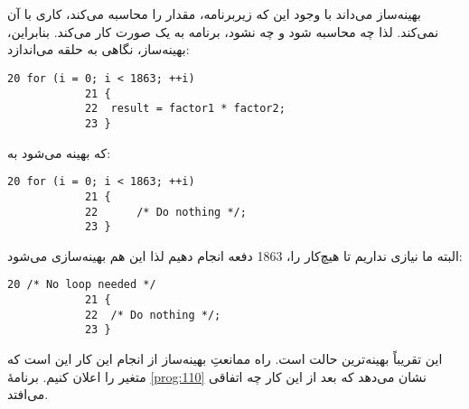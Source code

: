 \section{}
\paragraph{}\label{answer:89}
بهینه‌ساز می‌داند با وجود این که زیربرنامه، مقدار  را محاسبه می‌کند، کاری با آن نمی‌کند. لذا چه  محاسبه شود و چه نشود، برنامه به یک صورت کار می‌کند. بنابراین، بهینه‌ساز، نگاهی به حلقه می‌اندازد:
\begin{LTR}
        \begin{lstlisting}[style=C++Style]
            20 for (i = 0; i < 1863; ++i)
            21 {
            22  result = factor1 * factor2;
            23 }
        \end{lstlisting}
\end{LTR}
که بهینه می‌شود به:
\begin{LTR}
        \begin{lstlisting}[style=C++Style]
            20 for (i = 0; i < 1863; ++i)
            21 {
            22      /* Do nothing */;
            23 }
        \end{lstlisting}
\end{LTR}

البته ما نیازی نداریم تا هیچ‌کار را، 1863 دفعه انجام دهیم لذا این هم بهینه‌سازی می‌شود:
\begin{LTR}
        \begin{lstlisting}[style=C++Style]
            20 /* No loop needed */
            21 {
            22  /* Do nothing */;
            23 }
        \end{lstlisting}
\end{LTR}

این تقریباً بهینه‌ترین حالت است. راه ممانعتِ بهینه‌ساز از انجام این کار این است که متغیر  را  اعلان کنیم. برنامهٔ \ref{prog:110} نشان می‌دهد که بعد از این کار چه اتفاقی می‌افتد.